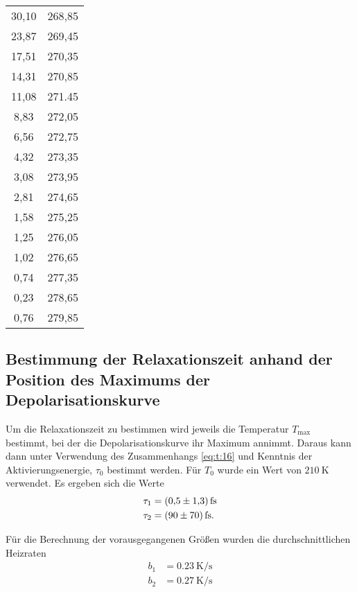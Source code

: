 \begin{longtable}{c c}
30,10 & 268,85\\
23,87 & 269,45\\
17,51 & 270,35\\
14,31 & 270,85\\
11,08 & 271.45\\
8,83 & 272,05\\
6,56 & 272,75\\
4,32 & 273,35\\
3,08 & 273,95\\
2,81 & 274,65\\
1,58 & 275,25\\
1,25 & 276,05\\
1,02 & 276,65\\
0,74 & 277,35\\
0,23 & 278,65\\
0,76 & 279,85\\
\hline
\end{longtable}


\subsection{Bestimmung der Relaxationszeit anhand der Position des Maximums der Depolarisationskurve}
\label{subsec:zeit}
Um die Relaxationszeit zu bestimmen wird jeweils die Temperatur $T_\text{max}$ bestimmt, bei der die Depolarisationskurve ihr Maximum annimmt.
Daraus kann dann unter Verwendung des Zusammenhangs \eqref{eq:t:16} und Kenntnis der Aktivierungsenergie, $\tau_{0}$ bestimmt werden.
Für $T_0$ wurde ein Wert von $\SI{210}{\kelvin}$  verwendet.
Es ergeben sich die Werte
\\
\begin{align*}
  \tau_{1} &= \SI{0.5+-1.3}{\femto\second}\\
  \tau_{2} &= \SI{90+-70}{\femto\second}.
\end{align*}

Für die Berechnung der vorausgegangenen Größen wurden die durchschnittlichen
Heizraten
\\
\begin{align*}
  b_{1} &= \SI{0.23}{\kelvin\per\second}\\
  b_{2} &= \SI{0.27}{\kelvin\per\second}
\end{align*}

